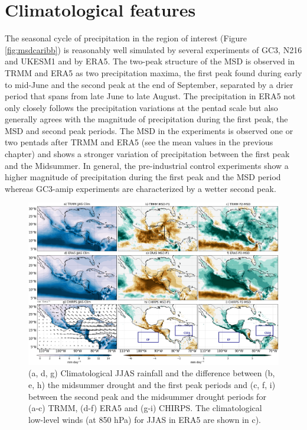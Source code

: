 \section{Climatological features}

\label{sq:msdclim}



The seasonal cycle of precipitation in the region of interest (Figure \ref{fig:msdcaribb}) is reasonably well simulated by several experiments of GC3, N216 and UKESM1 and by ERA5.
The two-peak structure of the MSD is observed in TRMM and ERA5 as two precipitation maxima, the first peak found during early to mid-June and the second peak at the end of September, separated by a drier period that spans from late June to late August. The precipitation in ERA5 not only closely follows the precipitation variations at the pentad scale but also generally agrees with the magnitude of precipitation during the first peak, the MSD and second peak periods.
The MSD in the experiments is observed one or two pentads after TRMM and ERA5 (see the mean values in the previous chapter) and shows a stronger variation of precipitation between the first peak and the Midsummer. 
In general, the pre-industrial control experiments show a higher magnitude of precipitation during the first peak and the MSD period whereas GC3-amip experiments are characterized by a wetter second peak. 

  \begin{figure}[t!]
\includegraphics[width=\linewidth]{figures/fig2obs_prdiff_2.png}
\caption{ (a, d, g) Climatological JJAS rainfall and the difference between  (b, e, h)  the midsummer drought and the first peak periods and (c, f, i)  between the second peak and the midsummer drought periods for (a-c) TRMM, (d-f) ERA5 and (g-i) CHIRPS. The climatological low-level winds (at 850 hPa) for JJAS in ERA5 are shown in c). }
\label{fig:eof2}
\end{figure} 
 



